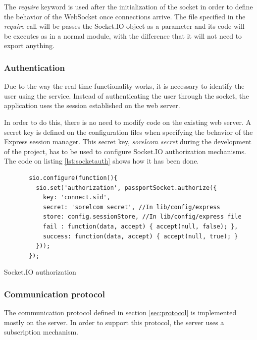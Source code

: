 The \textit{require} keyword is used after the initialization of the socket in order to define the behavior of the WebSocket once connections arrive. The file specified in the \textit{require} call will be passes the Socket.IO object as a parameter and its code will be executes as in a normal module, with the difference that it will not need to export anything.

\subsubsection{Authentication}

Due to the way the real time functionality works, it is necessary to identify the user using the service. Instead of authenticating the user through the socket, the application uses the session established on the web server. 

In order to do this, there is no need to modify code on the existing web server. A secret key is defined on the configuration files when specifying the behavior of the Express session manager. This secret key, \textit{sorelcom secret} during the development of the project, has to be used to configure Socket.IO authorization mechanisms. The code on listing \ref{lst:socketauth} shows how it has been done.

\begin{listing}[ht]\centering
  \begin{minipage}{.8\textwidth}
    \begin{verbatim}
       sio.configure(function(){
         sio.set('authorization', passportSocket.authorize({
           key: 'connect.sid',
           secret: 'sorelcom secret', //In lib/config/express
           store: config.sessionStore, //In lib/config/express file
           fail : function(data, accept) { accept(null, false); },
           success: function(data, accept) { accept(null, true); }
         }));
       });
    \end{verbatim}
  \end{minipage}
  \caption{Socket.IO authorization}\label{lst:socketauth}
\end{listing}

\subsubsection*{Communication protocol}

The communication protocol defined in section \ref{sec:protocol} is implemented mostly on the server. In order to support this protocol, the server uses a subscription mechanism. 

